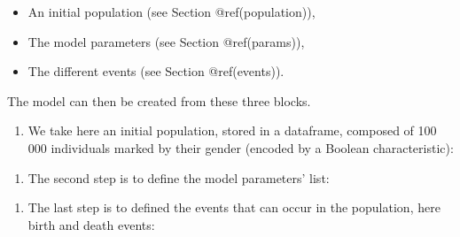 \begin{itemize}
\tightlist
\item
  An initial population (see Section @ref(population)),
\item
  The model parameters (see Section @ref(params)),
\item
  The different events (see Section @ref(events)).
\end{itemize}

The model can then be created from these three blocks.

\begin{enumerate}
\def\labelenumi{\arabic{enumi}.}
\tightlist
\item
  We take here an initial population, stored in a dataframe, composed of 100 000 individuals marked by their gender (encoded by a Boolean characteristic):
\end{enumerate}

\begin{Shaded}
\begin{Highlighting}[]
\StringTok{ }\OperatorTok{$}
\end{Highlighting}
\end{Shaded}

\begin{enumerate}
\def\labelenumi{\arabic{enumi}.}
\setcounter{enumi}{1}
\tightlist
\item
  The second step is to define the model parameters' list:
\end{enumerate}

\begin{Shaded}
\begin{Highlighting}[]
\StringTok{ }\NormalTok{(}\NormalTok{ =}\StringTok{  }\NormalTok{, }\NormalTok{ =}\NormalTok{, }\NormalTok{=}\StringTok{ }\NormalTok{,}
               \NormalTok{ =}\StringTok{ }\NormalTok{(}\NormalTok{(}\NormalTok{,}\NormalTok{),}\NormalTok{(}\NormalTok{,}\NormalTok{,}\NormalTok{)))}
\end{Highlighting}
\end{Shaded}

\begin{enumerate}
\def\labelenumi{\arabic{enumi}.}
\setcounter{enumi}{2}
\tightlist
\item
  The last step is to defined the events that can occur in the population, here birth and death events:
\end{enumerate}

